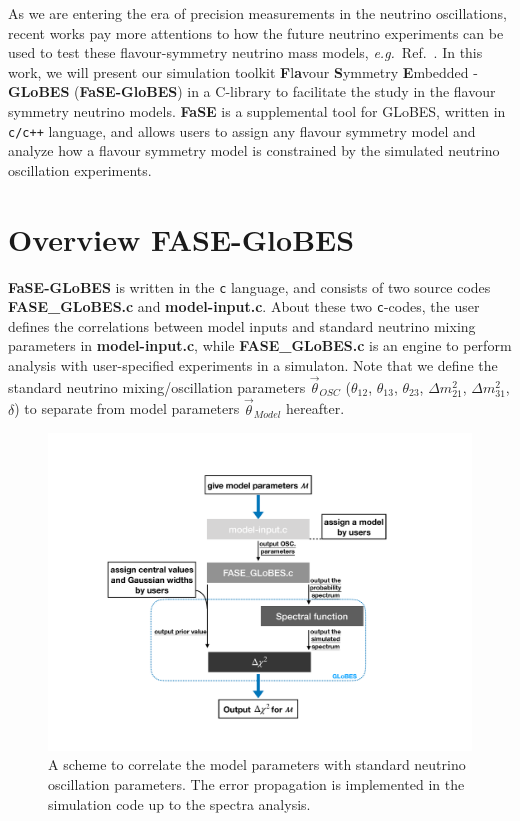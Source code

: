 \documentclass[aps,prd,nofootinbib,preprint]{revtex4}
\begin{document}
As we are entering the era of precision measurements in the neutrino oscillations, recent works pay more attentions to how the future neutrino experiments can be used to test these flavour-symmetry neutrino mass models, \textit{e.g.}~Ref.~\cite{Ballett:2016yod,Chatterjee:2017xkb, Ding:2019zhn, Tang:2019edw, Blennow:2020snb}. In this work, we will present our simulation toolkit \textbf{F}l\textbf{a}vour \textbf{S}ymmetry \textbf{E}mbedded - \textbf{GLoBES} (\textbf{FaSE-GloBES}) in a C-library to facilitate the study in the flavour symmetry neutrino models. \textbf{FaSE} is a supplemental tool for GLoBES, written in \texttt{c/c++} language, and allows users to assign any flavour symmetry model and analyze how a flavour symmetry model is constrained by the simulated neutrino oscillation experiments.

\section{Overview FASE-GloBES}\label{sec:overview}

\textbf{FaSE-GLoBES} is written in the \texttt{c} language, and consists of two source codes \textbf{FASE\_GLoBES.c} and \textbf{model-input.c}. About these two \texttt{c}-codes, the user defines the correlations between model inputs and standard neutrino mixing parameters in \textbf{model-input.c}, while \textbf{FASE\_GLoBES.c} is an engine to perform analysis with user-specified experiments in a simulaton. Note that we define the standard neutrino mixing/oscillation parameters $\vec{\theta}_{OSC}$ ($\theta_{12}$, $\theta_{13}$, $\theta_{23}$, $\Delta m_{21}^2$, $\Delta m_{31}^2$, $\delta$) to separate from model parameters $\vec{\theta}_{Model}$ hereafter.

\begin{figure}[!h]%
\centering
\includegraphics[width=7.5in]{Figs/FASE-chart_1_2.pdf}
\caption{A scheme to correlate the model parameters with standard neutrino oscillation parameters. The error propagation is implemented in the simulation code up to the spectra analysis.}%
\label{fig:FASE}
\end{figure}
\end{document}

